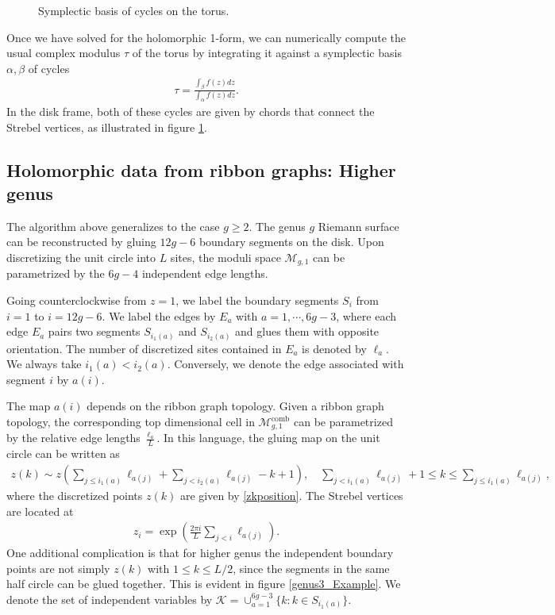 \documentclass[12pt]{article}
\def\ie{\begin{equation}\begin{aligned}}
\def\fe{\end{aligned}\end{equation}}
\numberwithin{equation}{section}
\begin{document}
\begin{figure}
\begin{center}
    \end{center}
    \caption{Symplectic basis of cycles on the torus.}
    \label{torus1cycles}
\end{figure}

Once we have solved for the holomorphic 1-form, we can numerically compute the usual complex modulus $\tau$ of the torus by integrating it against a symplectic basis $\alpha, \beta$ of cycles
\ie
\tau = \frac{\int_\beta f(z)dz}{\int_\alpha f(z)dz}.
\fe
In the disk frame, both of these cycles are given by chords that connect the Strebel vertices, as illustrated in figure \ref{torus1cycles}. 

\subsection{Holomorphic data from ribbon graphs: Higher genus}

\label{holodata}

The algorithm above generalizes to the case $g\geq 2$. The genus $g$ Riemann surface can be reconstructed by gluing $12g-6$ boundary segments on the disk. Upon discretizing the unit circle into $L$ sites, the moduli space $\mathcal{M}_{g,1}$ can be parametrized by the $6g-4$ independent edge lengths.

Going counterclockwise from $z=1$, we label the boundary segments $S_i$ from $i=1$ to $i=12g-6$. We label the edges by $E_a$ with $a=1,\cdots, 6g-3$, where each edge $E_a$ pairs two segments $S_{i_1(a)}$ and $S_{i_2(a)}$ and glues them with opposite orientation. The number of discretized sites contained in $E_a$ is denoted by $\ell_a$. We always take $i_1(a)<i_2(a)$. Conversely, we denote the edge associated with segment $i$ by $a(i)$. 

The map $a(i)$ depends on the ribbon graph topology. Given a ribbon graph topology, the corresponding top dimensional cell in $\mathcal{M}_{g,1}^{\text{comb}}$ can be parametrized by the relative edge lengths $\tfrac{\ell_a}{L}$. In this language, the gluing map on the unit circle can be written as
\ie\label{gluinggenusg}
z(k)\sim z\left(\sum_{j\leq i_1(a)}\ell_{a(j)}+\sum_{j< i_2(a)}\ell_{a(j)}-k+1\right),\quad \sum_{j<i_1(a)}\ell_{a(j)}+1\leq k \leq \sum_{j\leq i_1(a)}\ell_{a(j)},
\fe
where the discretized points $z(k)$ are given by \eqref{zkposition}. The Strebel vertices are located at
\ie
z_i = \exp\left(\frac{2\pi i}{L}\sum_{j<i}\ell_{a(j)}\right).
\fe
One additional complication is that for higher genus the independent boundary points are not simply $z(k)$ with $1\leq k \leq L/2$, since the segments in the same half circle can be glued together. This is evident in figure \ref{genus3_Example}. We denote the set of independent variables by $\mathcal{K}=\cup_{a=1}^{6g-3}\{k : k\in S_{i_1(a)}\}$.
\end{document}

